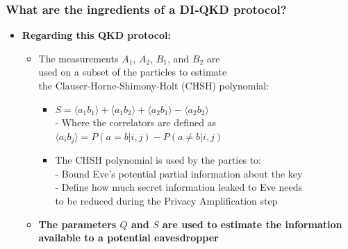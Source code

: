 \documentclass{beamer}
\begin{document}
		\begin{frame}
			\frametitle{\large What are the ingredients of a DI‑QKD protocol?}

            \vspace{3ex}
            \begin{itemize}
                \item \textbf{Regarding this QKD protocol:}
                \begin{itemize}
                    \item The measurements ${A}_{1}$, ${A}_{2}$, ${B}_{1}$, and ${B}_{2}$ are\\ used on a subset of the particles to estimate\\ the Clauser-Horne-Shimony-Holt (CHSH) polynomial:\\
                    \begin{itemize}
                        \small
                        \item $S = \langle {a}_{1} {b}_{1} \rangle + \langle {a}_{1} {b}_{2} \rangle + \langle {a}_{2} {b}_{1} \rangle - \langle {a}_{2} {b}_{2} \rangle$\\
                        \vspace{1ex}
                        - Where the correlators are defined as\\
                        \hspace{0.5em}$\langle {a}_{i} {b}_{j} \rangle = P(a = b | i,j) - P(a \neq b|i,j)$
                        \vspace{0.5em}
                        \small
                        \item The CHSH polynomial is used by the parties to:\\
                        \footnotesize
                        - Bound Eve's potential partial information about the key\\
                        \footnotesize
                        - Define how much secret information leaked to Eve needs\\\hspace{0.5em}to be reduced during the Privacy Amplification step
                    \end{itemize}
                    \item \textbf{The parameters $Q$ and $S$ are used to estimate the information available to a potential eavesdropper}
                \end{itemize}
            \end{itemize}
		\end{frame}
\end{document}
